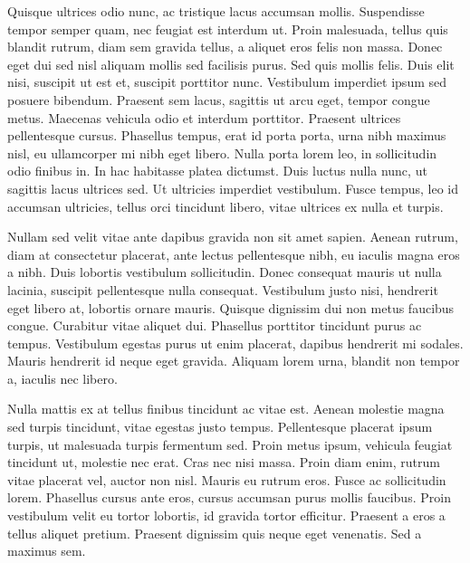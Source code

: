 Quisque ultrices odio nunc, ac tristique lacus accumsan mollis. Suspendisse tempor semper quam, nec feugiat est interdum ut. Proin malesuada, tellus quis blandit rutrum, diam sem gravida tellus, a aliquet eros felis non massa. Donec eget dui sed nisl aliquam mollis sed facilisis purus. Sed quis mollis felis. Duis elit nisi, suscipit ut est et, suscipit porttitor nunc. Vestibulum imperdiet ipsum sed posuere bibendum. Praesent sem lacus, sagittis ut arcu eget, tempor congue metus. Maecenas vehicula odio et interdum porttitor. Praesent ultrices pellentesque cursus. Phasellus tempus, erat id porta porta, urna nibh maximus nisl, eu ullamcorper mi nibh eget libero. Nulla porta lorem leo, in sollicitudin odio finibus in. In hac habitasse platea dictumst. Duis luctus nulla nunc, ut sagittis lacus ultrices sed. Ut ultricies imperdiet vestibulum. Fusce tempus, leo id accumsan ultricies, tellus orci tincidunt libero, vitae ultrices ex nulla et turpis.

Nullam sed velit vitae ante dapibus gravida non sit amet sapien. Aenean rutrum, diam at consectetur placerat, ante lectus pellentesque nibh, eu iaculis magna eros a nibh. Duis lobortis vestibulum sollicitudin. Donec consequat mauris ut nulla lacinia, suscipit pellentesque nulla consequat. Vestibulum justo nisi, hendrerit eget libero at, lobortis ornare mauris. Quisque dignissim dui non metus faucibus congue. Curabitur vitae aliquet dui. Phasellus porttitor tincidunt purus ac tempus. Vestibulum egestas purus ut enim placerat, dapibus hendrerit mi sodales. Mauris hendrerit id neque eget gravida. Aliquam lorem urna, blandit non tempor a, iaculis nec libero.

Nulla mattis ex at tellus finibus tincidunt ac vitae est. Aenean molestie magna sed turpis tincidunt, vitae egestas justo tempus. Pellentesque placerat ipsum turpis, ut malesuada turpis fermentum sed. Proin metus ipsum, vehicula feugiat tincidunt ut, molestie nec erat. Cras nec nisi massa. Proin diam enim, rutrum vitae placerat vel, auctor non nisl. Mauris eu rutrum eros. Fusce ac sollicitudin lorem. Phasellus cursus ante eros, cursus accumsan purus mollis faucibus. Proin vestibulum velit eu tortor lobortis, id gravida tortor efficitur. Praesent a eros a tellus aliquet pretium. Praesent dignissim quis neque eget venenatis. Sed a maximus sem.
